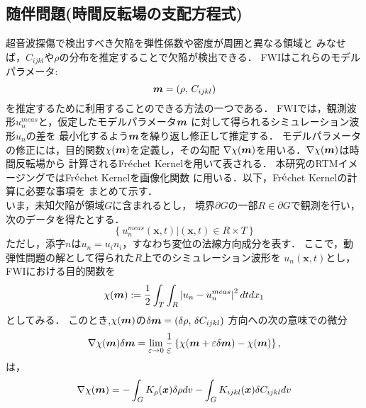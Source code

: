\subsection{随伴問題(時間反転場の支配方程式)}
超音波探傷で検出すべき欠陥を弾性係数や密度が周囲と異なる領域と
みなせば，$C_{ijkl}$や$\rho$の分布を推定することで欠陥が検出できる．
FWIはこれらのモデルパラメータ:
\begin{equation}
	\boldsymbol{m}=\left( \rho, \, C_{ijkl}\right)
	\label{eqn:mprms}
\end{equation}
を推定するために利用することのできる方法の一つである．
FWIでは，観測波形$u_n^{meas}$と，仮定したモデルパラメータ$\boldsymbol{m}$
に対して得られるシミュレーション波形$u_n$の差を
最小化するよう$\boldsymbol{m}$を繰り返し修正して推定する．
%
モデルパラメータの修正には，目的関数$\chi(\boldsymbol{m})$を定義し，その勾配
$\nabla \chi(\boldsymbol{m})$を用いる．$\nabla \chi(\boldsymbol{m})$は時間反転場から
計算されるFr$\acute{\rm e}$chet Kernelを用いて表される．
本研究のRTMイメージングではFr$\acute{\rm e}$chet Kernelを画像化関数
に用いる．以下，Fr$\acute{\rm e}$chet Kernelの計算に必要な事項を
まとめて示す．
%
\\
\hspace{\parindent}
いま，未知欠陥が領域$G$に含まれるとし，
境界$\partial G$の一部$R\in\partial G$で観測を行い，次のデータを得たとする．
\begin{equation}
	\left\{ 
	\left. 
	u_n^{meas}(\boldsymbol{x},t)\right|  (\boldsymbol{x},t)\in R\times T
	\right\}
	\label{eqn:data}
\end{equation}
ただし，添字$n$は$u_n=u_in_i$，すなわち変位の法線方向成分を表す．
ここで，動弾性問題の解として得られた$R$上でのシミュレーション波形を
$u_n(\boldsymbol{x},t)$とし，FWIにおける目的関数を
\begin{equation}
	\chi(\boldsymbol{m}):= \frac{1}{2} \int _T\int _R \left|u_n-u_n^{meas}\right|^2 dtdx_1
	\label{eqn:cost}
\end{equation}
としてみる．
このとき,$\chi(\boldsymbol{m})$の$\delta \boldsymbol{m}=(\delta \rho,\, \delta C_{ijkl})$
方向への次の意味での微分
\begin{equation}
	\nabla \chi (\boldsymbol{m})\delta \boldsymbol{m} = \lim_{\varepsilon \rightarrow 0}
	\frac{1}{\varepsilon}
	\left\{
		\chi(\boldsymbol{m}+\varepsilon \delta \boldsymbol{m})
		-
		\chi(\boldsymbol{m})
	\right\}, 
	\label{eqn:del_chi}
\end{equation}
は，
\begin{equation}
	\nabla \chi(\boldsymbol{m}) = 
	-\int_G K_{\rho}(\boldsymbol{x})\delta \rho dv
	- 
	\int_G K_{ijkl}(\boldsymbol{x}) \delta C_{ijkl} dv
	\label{eqn:}
\end{equation}

